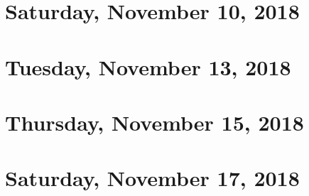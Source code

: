 \documentclass[reqno]{amsart}
\begin{document}
\section{Saturday, November 10, 2018}
    
    
\section{Tuesday, November 13, 2018}
    
    
\section{Thursday, November 15, 2018}
    

\section{Saturday, November 17, 2018}
    
\end{document}
